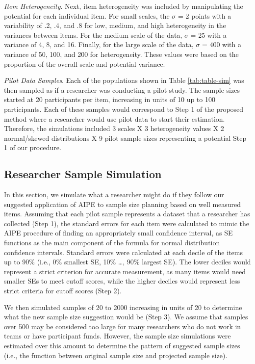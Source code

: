\documentclass[
  man]{apa7}
\begin{document}
\emph{Item Heterogeneity}. Next, item heterogeneity was included by manipulating the potential for each individual item. For small scales, the \(\sigma\) = 2 points with a variability of .2, .4, and .8 for low, medium, and high heterogeneity in the variances between items. For the medium scale of the data, \(\sigma\) = 25 with a variance of 4, 8, and 16. Finally, for the large scale of the data, \(\sigma\) = 400 with a variance of 50, 100, and 200 for heterogeneity. These values were based on the proportion of the overall scale and potential variance.

\emph{Pilot Data Samples}. Each of the populations shown in Table \ref{tab:table-sim} was then sampled as if a researcher was conducting a pilot study. The sample sizes started at 20 participants per item, increasing in units of 10 up to 100 participants. Each of these samples would correspond to Step 1 of the proposed method where a researcher would use pilot data to start their estimation. Therefore, the simulations included 3 scales X 3 heterogeneity values X 2 normal/skewed distributions X 9 pilot sample sizes representing a potential Step 1 of our procedure.

\hypertarget{researcher-sample-simulation}{%
\subsection{Researcher Sample Simulation}\label{researcher-sample-simulation}}

In this section, we simulate what a researcher might do if they follow our suggested application of AIPE to sample size planning based on well measured items. Assuming that each pilot sample represents a dataset that a researcher has collected (Step 1), the standard errors for each item were calculated to mimic the AIPE procedure of finding an appropriately small confidence interval, as SE functions as the main component of the formula for normal distribution confidence intervals. Standard errors were calculated at each decile of the items up to 90\% (i.e., 0\% smallest SE, 10\% \ldots, 90\% largest SE). The lower deciles would represent a strict criterion for accurate measurement, as many items would need smaller SEs to meet cutoff scores, while the higher deciles would represent less strict criteria for cutoff scores (Step 2).

We then simulated samples of 20 to 2000 increasing in units of 20 to determine what the new sample size suggestion would be (Step 3). We assume that samples over 500 may be considered too large for many researchers who do not work in teams or have participant funds. However, the sample size simulations were estimated over this amount to determine the pattern of suggested sample sizes (i.e., the function between original sample size and projected sample size).
\end{document}
